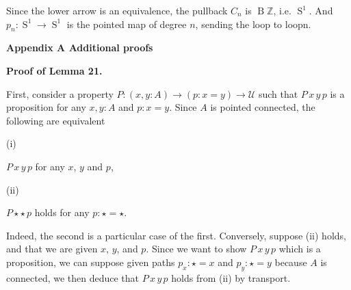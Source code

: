 Since the lower arrow is an equivalence, the pullback $C_{n}$ is $\operatorname{B}\mathbb{Z}$, i.e. $\operatorname{S}^{1}$. And $p_{n}:\operatorname{S}^{1}\to\operatorname{S}^{1}$ is the pointed map of degree $n$, sending the loop to loopn.\par
 
 
 
 
 


 
\par\medskip\noindent\textbf{Appendix A Additional proofs}\par
 
 
\par\medskip\noindent\textbf{Proof of Lemma 21.}\par
 
 
First, consider a property $P:(x,y:A)\to(p:x=y)\to\mathcal{U}$ such that $P\,x\,y\,p$ is a proposition for any $x,y:A$ and $p:x=y$. Since $A$ is pointed connected, the following are equivalent\par
  
\par\noindent  (i) 
 
$P\,x\,y\,p$ for any $x$, $y$ and $p$,\par
 
 
 
\par\noindent  (ii) 
 
$P\star\star\,p$ holds for any $p:\star=\star$.\par
 
 
  
Indeed, the second is a particular case of the first. Conversely, suppose (ii) holds, and that we are given $x$, $y$, and $p$. Since we want to show $P\,x\,y\,p$ which is a proposition, we can suppose given paths $p_{x}:\star=x$ and $p_{y}:\star=y$ because $A$ is connected, we then deduce that $P\,x\,y\,p$ holds from (ii) by transport.\par
 
 
 
